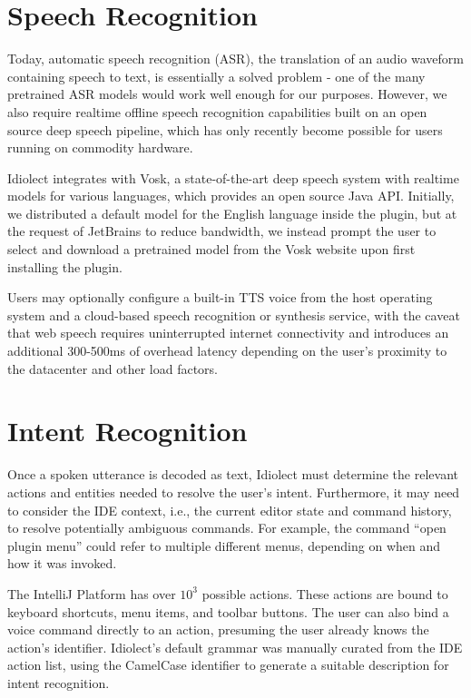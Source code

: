 \documentclass[conference]{IEEEtran}
\begin{document}
\section{Speech Recognition}

Today, automatic speech recognition (ASR), the translation of an audio waveform containing speech to text, is essentially a solved problem - one of the many pretrained ASR models would work well enough for our purposes. However, we also require realtime offline speech recognition capabilities built on an open source deep speech pipeline, which has only recently become possible for users running on commodity hardware.

Idiolect integrates with Vosk, a state-of-the-art deep speech system with realtime models for various languages, which provides an open source Java API. Initially, we distributed a default model for the English language inside the plugin, but at the request of JetBrains to reduce bandwidth, we instead prompt the user to select and download a pretrained model from the Vosk website upon first installing the plugin.


Users may optionally configure a built-in TTS voice from the host operating system and a cloud-based speech recognition or synthesis service, with the caveat that web speech requires uninterrupted internet connectivity and introduces an additional 300-500ms of overhead latency depending on the user's proximity to the datacenter and other load factors.

\section{Intent Recognition}

Once a spoken utterance is decoded as text, Idiolect must determine the relevant actions and entities needed to resolve the user's intent. Furthermore, it may need to consider the IDE context, i.e., the current editor state and command history, to resolve potentially ambiguous commands. For example, the command ``open plugin menu'' could refer to multiple different menus, depending on when and how it was invoked.

The IntelliJ Platform has over $10^3$ possible actions. These actions are bound to keyboard shortcuts, menu items, and toolbar buttons. The user can also bind a voice command directly to an action, presuming the user already knows the action's identifier. Idiolect's default grammar was manually curated from the IDE action list, using the CamelCase identifier to generate a suitable description for intent recognition.
\end{document}
